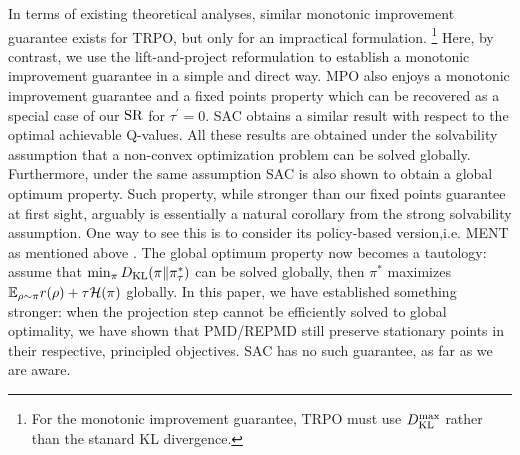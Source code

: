 In terms of existing theoretical analyses, 
similar monotonic improvement guarantee exists for TRPO, but only for an
impractical formulation.%
%
\footnote{
	For the monotonic improvement guarantee,
	TRPO must use $D_{\mathrm{KL}}^{\max} $ rather than the stanard KL divergence.
} 
Here, by contrast,
we use the lift-and-project reformulation to establish a monotonic
improvement guarantee in a simple and direct way.
MPO also enjoys a monotonic
improvement guarantee and a fixed points property which can be recovered as a special case of our $\text{SR}$ for $\tau^\prime = 0$. 
SAC obtains a similar result with respect to the optimal achievable
Q-values.
All these results are obtained under the solvability assumption that a non-convex optimization problem can be solved globally.
Furthermore, under the same assumption SAC is also shown to obtain a global optimum property. 
Such property, while stronger than our fixed points guarantee at first sight, arguably is essentially a natural corollary from the strong solvability assumption.
One way to see this is to consider its policy-based version,i.e. MENT as mentioned above \cite{levine2018reinforcement}. 
The global optimum property now becomes a tautology: assume that $\min_\pi D_{\mathrm{KL}}(\pi \| \pi^*_\tau)$ can be solved globally, then $\pi^*$ maximizes $\mathbb{E}_{\rho \sim \pi} r(\rho) + \tau \mathcal{H}(\pi)$  globally.
In this paper, we have established something stronger:
when the projection step cannot be efficiently solved to global optimality,
we have shown that PMD/REPMD still preserve stationary points in 
their respective, principled objectives.
SAC has no such guarantee, as far as we are aware. 

